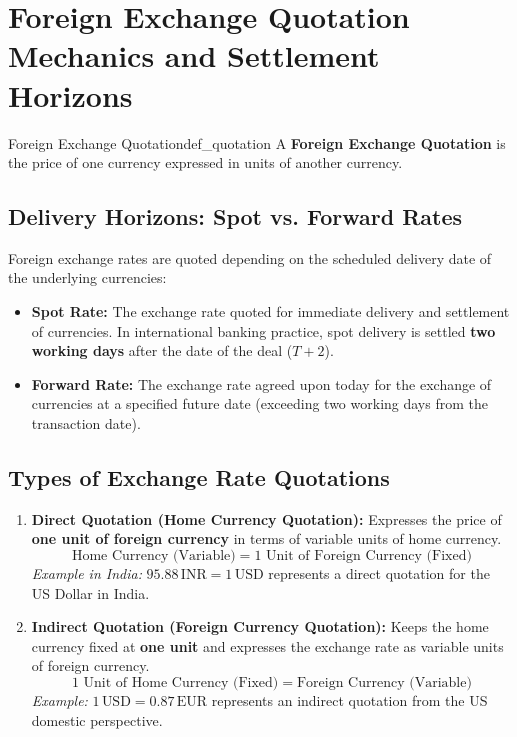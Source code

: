 \section{Foreign Exchange Quotation Mechanics and Settlement Horizons}

\begin{definition}{Foreign Exchange Quotation}{def_quotation}
A \textbf{Foreign Exchange Quotation} is the price of one currency expressed in units of another currency.
\end{definition}

\subsection{Delivery Horizons: Spot vs. Forward Rates}
Foreign exchange rates are quoted depending on the scheduled delivery date of the underlying currencies:
\begin{itemize}[leftmargin=*]
    \item \textbf{Spot Rate:} The exchange rate quoted for immediate delivery and settlement of currencies. In international banking practice, spot delivery is settled \textbf{two working days} after the date of the deal ($T+2$).
    \item \textbf{Forward Rate:} The exchange rate agreed upon today for the exchange of currencies at a specified future date (exceeding two working days from the transaction date).
\end{itemize}

\subsection{Types of Exchange Rate Quotations}
\begin{enumerate}[leftmargin=*]
    \item \textbf{Direct Quotation (Home Currency Quotation):} Expresses the price of \textbf{one unit of foreign currency} in terms of variable units of home currency.
    \begin{equation}
        \text{Home Currency (Variable)} = 1 \text{ Unit of Foreign Currency (Fixed)}
    \end{equation}
    \textit{Example in India:} $95.88\,\text{INR} = 1\,\text{USD}$ represents a direct quotation for the US Dollar in India.
    
    \item \textbf{Indirect Quotation (Foreign Currency Quotation):} Keeps the home currency fixed at \textbf{one unit} and expresses the exchange rate as variable units of foreign currency.
    \begin{equation}
        1 \text{ Unit of Home Currency (Fixed)} = \text{Foreign Currency (Variable)}
    \end{equation}
    \textit{Example:} $1\,\text{USD} = 0.87\,\text{EUR}$ represents an indirect quotation from the US domestic perspective.
\end{enumerate}

